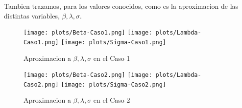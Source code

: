 Tambien trazamos, para los valores conocidos, como es la aproximacion de las distintas variables, $\beta, \lambda, \sigma$.

\begin{figure} [H]

\texttt{[image: plots/Beta-Caso1.png]}
\texttt{[image: plots/Lambda-Caso1.png]}
\texttt{[image: plots/Sigma-Caso1.png]}

\caption{Aproximacion a $\beta, \lambda, \sigma$ en el Caso 1}
\label{fig:AproxCaso1}
\end{figure}

\begin{figure} [H]

\texttt{[image: plots/Beta-Caso2.png]}
\texttt{[image: plots/Lambda-Caso2.png]}
\texttt{[image: plots/Sigma-Caso2.png]}

\caption{Aproximacion a $\beta, \lambda, \sigma$ en el Caso 2}
\label{fig:AproxCaso1}
\end{figure}